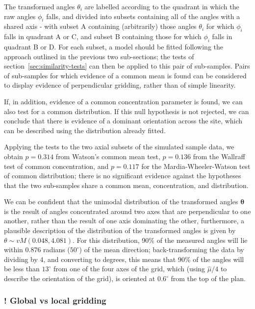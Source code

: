 \documentclass[../../ArchStats.tex]{subfiles}
\begin{document}
The transformed angles $\theta_i$ are labelled according to the quadrant in which the raw angles $\phi_i$ falls, and divided into subsets containing all of the angles with a shared axis - with subset A containing (arbitrarily) those angles $\theta_i$ for which $\phi_i$ falls in quadrant A or C, and subset B containing those for which $\phi_i$ falls in quadrant B or D. For each subset, a model should be fitted following the approach outlined in the previous two sub-sections; the tests of section~\ref{sec:similarity-tests} can then be applied to this pair of sub-samples. Pairs of sub-samples for which evidence of a common mean is found can be considered to display evidence of perpendicular gridding, rather than of simple linearity.

If, in addition, evidence of a common concentration parameter is found, we can also test for a common distribution. If this null hypothesis is not rejected, we can conclude that there is evidence of a dominant orientation across the site, which can be described using the distribution already fitted.

Applying the tests to the two axial subsets of the simulated sample data, we obtain $p = 0.314$ from Watson's common mean test, $p=0.136$ from the Wallraff test of common concentration, and $p = 0.117$ for the Mardia-Wheeler-Watson test of common distribution; there is no significant evidence against the hypotheses that the two sub-samples share a common mean, concentration, and distribution.

We can be confident that the unimodal distribution of the transformed angles $\boldsymbol{\theta}$ is the result of angles concentrated around two axes that are perpendicular to one another, rather than the result of one axis dominating the other, furthermore, a plausible description of the distribution of the transformed angles is given by $\theta \sim vM(0.048, 4.081)$. For this distribution, 90\% of the measured angles will lie within 0.876 radians ($50^\circ$) of the mean direction; back-transforming the data by dividing by 4, and converting to degrees, this means that 90\% of the angles will be less than $13^\circ$ from one of the four axes of the grid, which (using $\hat{\mu}/4$ to describe the orientation of the grid), is oriented at $0.6^\circ$ from the top of the plan. 


\subsubsection{! Global vs local gridding}
\label{sec:global-gridding}
\end{document}
